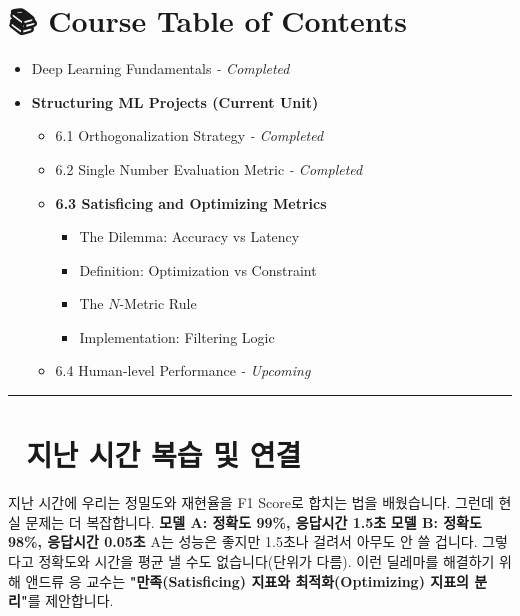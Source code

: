 \documentclass[11pt,a4paper]{book}
\theoremstyle{definition}
\begin{document}
\section*{📚 Course Table of Contents}
\begin{itemize}
    \item[Chapter 1-5.] Deep Learning Fundamentals \textit{- Completed}
    \item[\textbf{Chapter 6.}] \textbf{Structuring ML Projects (Current Unit)}
    \begin{itemize}
        \item 6.1 Orthogonalization Strategy \textit{- Completed}
        \item 6.2 Single Number Evaluation Metric \textit{- Completed}
        \item \textbf{6.3 Satisficing and Optimizing Metrics}
        \begin{itemize}
            \item The Dilemma: Accuracy vs Latency
            \item Definition: Optimization vs Constraint
            \item The $N$-Metric Rule
            \item Implementation: Filtering Logic
        \end{itemize}
        \item 6.4 Human-level Performance \textit{- Upcoming}
    \end{itemize}
\end{itemize}

\vspace{0.5cm}
\hrule
\vspace{0.5cm}

\section*{🔗 지난 시간 복습 및 연결}
지난 시간에 우리는 정밀도와 재현율을 F1 Score로 합치는 법을 배웠습니다.
그런데 현실 문제는 더 복잡합니다.
\textbf{모델 A: 정확도 99\%, 응답시간 1.5초}
\textbf{모델 B: 정확도 98\%, 응답시간 0.05초}
A는 성능은 좋지만 1.5초나 걸려서 아무도 안 쓸 겁니다. 그렇다고 정확도와 시간을 평균 낼 수도 없습니다(단위가 다름).
이런 딜레마를 해결하기 위해 앤드류 응 교수는 \textbf{"만족(Satisficing) 지표와 최적화(Optimizing) 지표의 분리"}를 제안합니다.

\end{document}

